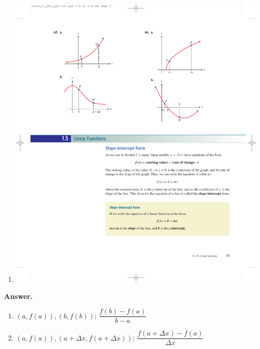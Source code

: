 \documentclass[10pt,]{book}
\theoremstyle{plain}
\theoremstyle{definition}
\theoremstyle{definition}
\theoremstyle{definition}
\theoremstyle{definition}
\numberwithin{equation}{part}
\begin{document}
\begin{exercisegroup}
\begin{multicols}{2}
\begin{enumerate}[label=*\alph**]
%
\item\hypertarget{li-1097}{}\includegraphics[width=0.8\linewidth]{images/fig-ex-1-4-65b}
%
\end{enumerate}
\end{multicols}
%
\par\smallskip
\noindent\textbf{Answer.}\hypertarget{answer-158}{}\quad
\leavevmode%
\begin{multicols}{2}
\begin{enumerate}[label=*\alph**]
\item\hypertarget{li-1098}{}\((a, f (a)), (b, f (b))\); \(\dfrac{f (b) - f (a)}{b-a}\)%
\item\hypertarget{li-1099}{}\((a, f (a)), (a+\Delta x, f (a+\Delta x))\); \(\dfrac{f (a+\Delta x) - f (a)}{\Delta x}\)%
\end{enumerate}
\end{multicols}
%
\exercise[66.]\hypertarget{exercise-281}{}\leavevmode%
\begin{multicols}{2}
\begin{enumerate}[label=*\alph**]

\end{enumerate}
\end{multicols}
\end{exercisegroup}
\end{document}
